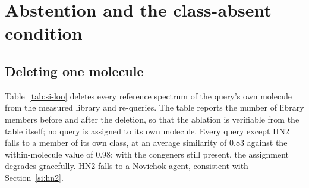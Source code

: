 \documentclass[11pt]{article}
\begin{document}
\section{Abstention and the class-absent condition}
\label{si:absten}

\subsection{Deleting one molecule}

Table~\ref{tab:si-loo} deletes every reference spectrum of the query's own molecule from
the measured library and re-queries. The table reports the number of library members before
and after the deletion, so that the ablation is verifiable from the table itself; no query
is assigned to its own molecule. Every query except HN2 falls to a member of its own class,
at an average similarity of 0.83 against the within-molecule value of 0.98: with the
congeners still present, the assignment degrades gracefully. HN2 falls to a Novichok agent,
consistent with Section~\ref{si:hn2}.
\end{document}
